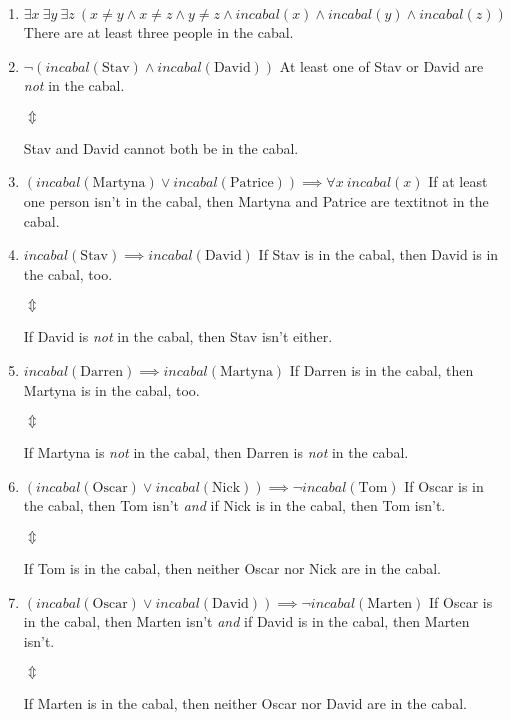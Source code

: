 \documentclass[a4paper]{article}
\begin{document}
\begin{enumerate}[label=(\roman*)]
	\item \label{itm:1} $\exists x\ \exists y\ \exists z\ \left( x \neq y \land x \neq z \land y \neq z \land incabal(x) \land incabal(y) \land incabal(z) \right)$
\medbreak
	There are at least three people in the cabal.
\item \label{itm:2} $\lnot \left( incabal(\text{Stav}) \land incabal(\text{David})\right)$
\medbreak
	At least one of Stav or David are \textit{not} in the cabal.
	\begin{center}
	$\Updownarrow$
	\end{center}
	Stav and David cannot both be in the cabal.
\medbreak
	\item \label{itm:3} $(incabal(\text{Martyna}) \lor incabal(\text{Patrice})) \implies \forall x\ incabal(x)$
\medbreak
	If at least one person isn't in the cabal, then Martyna and Patrice are textit{not} in the cabal.
\medbreak
\item \label{itm:4} $incabal(\text{Stav}) \implies incabal(\text{David})$
\medbreak
	If Stav is in the cabal, then David is in the cabal, too.
	\begin{center}
	$\Updownarrow$
	\end{center}
	If David is \textit{not} in the cabal, then Stav isn't either.
\medbreak
	\item \label{itm:5} $incabal(\text{Darren}) \implies incabal(\text{Martyna})$
\medbreak
	If Darren is in the cabal, then Martyna is in the cabal, too.
	\begin{center}
	$\Updownarrow$
	\end{center}
	If Martyna is \textit{not} in the cabal, then Darren is \textit{not} in the cabal.
\medbreak
	\item \label{itm:6} $\left(incabal(\text{Oscar}) \lor incabal(\text{Nick})\right) \implies \lnot incabal(\text{Tom})$
\medbreak
	If Oscar is in the cabal, then Tom isn't \textit{and} if Nick is in the cabal, then Tom isn't.
	\begin{center}
	$\Updownarrow$
	\end{center}
	If Tom is in the cabal, then neither Oscar nor Nick are in the cabal.
\medbreak
	\item \label{itm:7} $\left(incabal(\text{Oscar}) \lor incabal(\text{David})\right) \implies \lnot incabal(\text{Marten})$
\medbreak
	If Oscar is in the cabal, then Marten isn't \textit{and} if David is in the cabal, then Marten isn't.
	\begin{center}
	$\Updownarrow$
	\end{center}
	If Marten is in the cabal, then neither Oscar nor David are in the cabal.
\end{enumerate}
\end{document}
